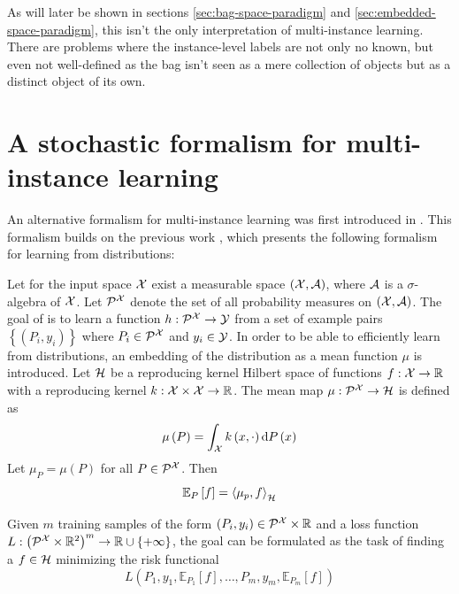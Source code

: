 As will later be shown in sections \ref{sec:bag-space-paradigm} and \ref{sec:embedded-space-paradigm}, this isn't the only interpretation of multi-instance learning. There are problems where the instance-level labels are not only no known, but even not well-defined as the bag isn't seen as a mere collection of objects but as a distinct object of its own.

\section{A stochastic formalism for multi-instance learning}
An alternative formalism for multi-instance learning was first introduced in \cite{pevny_using_2017}. This formalism builds on the previous work \cite{muandet_learning_2012}, which presents the following formalism for learning from distributions:

Let for the input space \( \mathcal{X} \) exist a measurable space \( \left( \mathcal{X}, \mathcal{A} \right) \), where \( \mathcal{A} \) is a \( \sigma \)-algebra of \( \mathcal{X} \). Let \( \mathcal{P}^\mathspace{X} \) denote the set of all probability measures on \( \left( \mathcal{X}, \mathcal{A} \right) \). The goal of is to learn a function \( h : \mathcal{P}^{\mathcal{X}} \to \mathcal{Y} \) from a set of example pairs \( \left\{ \left( P_i, y_i \right) \right\} \) where \( P_i \in \mathcal{P}^\mathspace{X} \) and \( y_i \in \mathcal{Y} \). In order to be able to efficiently learn from distributions, an embedding of the distribution as a mean function \( \mu \) is introduced. Let \( \mathcal{H} \) be a reproducing kernel Hilbert space of functions \( f : \mathcal{X} \to \mathbb{R} \) with a reproducing kernel \( k : \mathcal{X} \times \mathcal{X} \to \mathbb{R} \). The mean map \( \mu : \mathcal{P}^\mathspace{X} \to \mathspace{H} \) is defined as
\[ \mu \left( P \right) = \int_\mathspace{X} k \left( x, \cdot \right) \mathrm{d}P \left( x \right) \]
Let \( \mu_P = \mu \left( P \right) \) for all \( P \in \mathcal{P}^\mathspace{X} \). Then
\[ \mathbb{E}_P \left[ f \right] = \Braket{\mu_p, f}_\mathspace{H} \]

Given \( m \) training samples of the form \( \left( P_i, y_i \right) \in \mathcal{P}^\mathspace{X} \times \mathfield{R} \) and a loss function \( L : \left( \mathcal{P}^\mathspace{X} \times \mathfield{R}^2 \right)^m \to \mathfield{R} \cup \left\{ +\infty \right\} \), the goal can be formulated as the task of finding a \( f \in \mathcal{H} \) minimizing the risk functional
\[ L \left( P_1, y_1, \mathbb{E}_{P_1} \left[ f \right], \dots, P_m, y_m, \mathbb{E}_{P_m} \left[ f \right] \right) \]

